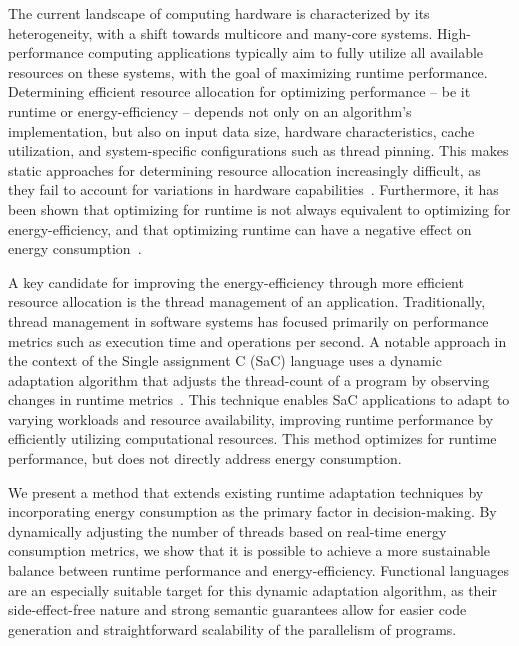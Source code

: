 \documentclass[runningheads]{llncs}
\begin{document}
The current landscape of computing hardware is characterized by its heterogeneity, with a shift towards multicore and many-core systems.
High-perfor\-mance computing applications typically aim to fully utilize all available resources on these systems, with the goal of maximizing runtime performance.
Determining efficient resource allocation for optimizing performance -- be it runtime or energy-efficiency -- depends not only on an algorithm's implementation, but also on input data size, hardware characteristics, cache utilization, and system-specific configurations such as thread pinning.
This makes static approaches for determining resource allocation increasingly difficult, as they fail to account for variations in hardware capabilities~\cite{buchty2022survey}.
Furthermore, it has been shown that optimizing for runtime is not always equivalent to optimizing for energy-efficiency, and that optimizing runtime can have a negative effect on energy consumption~\cite{bangash2022black,Pallister2016exploring}.

A key candidate for improving the energy-efficiency through more efficient resource allocation is the thread management of an application.
Traditionally, thread management in software systems has focused primarily on performance metrics such as execution time and operations per second.
A notable approach in the context of the Single assignment C (SaC) language uses a dynamic adaptation algorithm that adjusts the thread-count of a program by observing changes in runtime metrics~\cite{gordon2015dynamic}.
This technique enables SaC applications to adapt to varying workloads and resource availability, improving runtime performance by efficiently utilizing computational resources.
This method optimizes for runtime performance, but does not directly address energy consumption.

We present a method that extends existing runtime adaptation techniques by incorporating energy consumption as the primary factor in decision-making.
By dynamically adjusting the number of threads based on real-time energy consumption metrics, we show that it is possible to achieve a more sustainable balance between runtime performance and energy-efficiency.
Functional languages are an especially suitable target for this dynamic adaptation algorithm, as their side-effect-free nature and strong semantic guarantees allow for easier code generation and straightforward scalability of the parallelism of programs.
\end{document}
